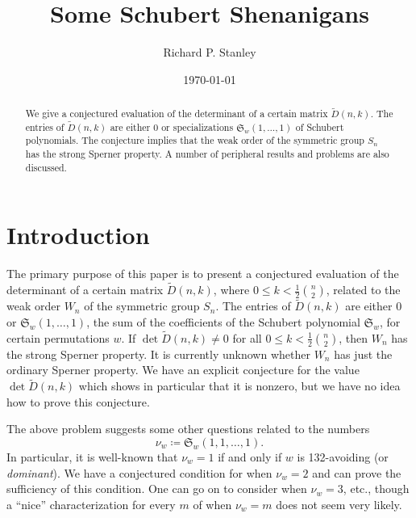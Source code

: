 \documentclass[12pt]{amsart}
\theoremstyle{definition}
\theoremstyle{remark}
\numberwithin{equation}{section}
\begin{document}
\title{Some Schubert Shenanigans}

\date{\today}

\author{Richard P. Stanley}
\address{Department of Mathematics, University of Miami, Coral Gables,
FL 33124}

\begin{abstract}
We give a conjectured evaluation of the determinant of a certain
matrix $\tilde{D}(n,k)$. The entries of $\tilde{D}(n,k)$ are
either 0 or specializations ${\mathfrak{S}}_w(1,\dots,1)$ of Schubert
polynomials. The conjecture implies that the weak order of the
symmetric group $S_n$ has the strong Sperner property. A number of
peripheral results and problems are also discussed.
\end{abstract}

\maketitle

\section{Introduction} \label{intro}
The primary purpose of this paper is to present a conjectured
evaluation of the determinant of a certain matrix $\tilde{D}(n,k)$,
where $0\leq k< \frac 12\binom n2$, related to the weak order $W_n$ of
the symmetric group $S_n$. The entries of $\tilde{D}(n,k)$ are either
0 or ${\mathfrak{S}}_w(1,\dots,1)$, the sum of the coefficients of the Schubert
polynomial ${\mathfrak{S}}_w$, for certain permutations $w$.  If
$\det\tilde{D}(n,k)\neq 0$ for all $0\leq k<\frac 12\binom n2$, then
$W_n$ has the strong Sperner property. It is currently unknown whether
$W_n$ has just the ordinary Sperner property. We have an explicit
conjecture for the value $\det\tilde{D}(n,k)$ which shows in particular
that it is nonzero, but we have no idea how to prove this conjecture.

The above problem suggests some other questions related to the numbers
  \begin{equation} \nu_w\coloneqq {\mathfrak{S}}_w(1,1,\dots,1). \label{eq:nu} \end{equation}
In particular, it is well-known that $\nu_w=1$ if and only if
$w$ is 132-avoiding (or \emph{dominant}). We have a conjectured
condition for when $\nu_w=2$ and can prove the sufficiency of this
condition. One can go on to consider when $\nu_w=3$, etc., though a
``nice'' characterization for every $m$ of when $\nu_w=m$ does not
seem very likely.
\end{document}
